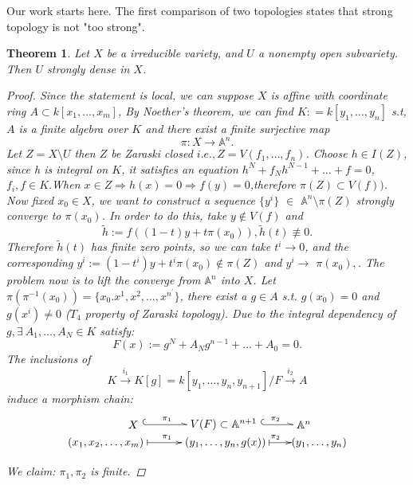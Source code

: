 \documentclass[a4paper]{article}
\newtheorem{thm}{Theorem}
\theoremstyle{definition}
\theoremstyle{remark}
\begin{document}
  Our work starts here. The first comparison of two topologies states that strong topology is not "too strong".
  \begin{thm} Let $X$ be a irreducible variety, and  $U$ a nonempty open subvariety. Then $U$ strongly dense in $X$.
    \begin{proof}
        Since the statement is local, we can suppose $ X $ is affine with coordinate ring $ A  \subset   k[x_1,   \dots,   x_m]  $, By Noether's theorem, we can find $K: =k [y_1,\dots,y_n]$ s.t, $A$ is a finite algebra over $K$ and there exist a finite surjective map
                     \[\pi: X \rightarrow \mathbb{A}^n.\]
         Let $ Z = X   \setminus U$ then $Z$  be Zaraski closed $i.e., Z=V(f_1,\dots,f_n)$. Choose $h\in I(Z)$, since h is integral on $K$, it satisfies an equation $h^N+f_Nh^{N-1}+\dots+f=0$, $f_i,f\in K.$When $x \in Z \Rightarrow h(x)=0 \Rightarrow f(y)=0$,therefore $\pi(Z)\subset V(f))$.
         Now fixed $x_0\in X$, we want to construct a sequence $\{y^i\}$ $\in$ $\mathbb{A}^n\setminus\pi(Z)$ strongly converge to $\pi(x_0)$. In order to do this, take $y \not \in V(f)$ and
                    \[\tilde{h}:=f((1-t)y+t\pi(x_0)), \tilde{h}(t)\not \equiv 0.\]
        Therefore $\tilde{h}(t)$ has finite zero points, so we can take $t^i \rightarrow 0$, and the corresponding $y^i:=(1-t^i)y+t^i\pi(x_0)\not \in \pi(Z)$ and $y^i \rightarrow$ $ \pi(x_0), $.
        The problem now is to lift the converge from $\mathbb{A}^n$ into $X$. Let$\pi(\pi^{-1}(x_0))=\{x_0.x^1,x^2,\dots,x^{n^\prime}\}$, there exist a $g\in A$ s.t. $g(x_0)=0$ and $g(x^i)\not = 0$ ($T_4$ property of Zaraski topology). Due to the integral dependency of $g, \exists  \ A_1,\dots,A_N \in K$ satisfy:
                    \[F(x):=g^N+A_Ng^{n-1}+\dots+A_0=0.\]
       The inclusions of
                     \[K \xrightarrow{i_1}     K[g]=k[y_1,\dots,y_n,y_{n+1}]/F \xrightarrow{i_2}      A\]
        induce a morphism chain:
        \begin{displaymath}
                \xymatrix@R=0ex@C=0ex{
                    *[l]{X \ \ }                             \ar@{^(-^>}[r]^(0.3){\pi_1}  &V(F)\subset \mathbb{A}^{n+1} \   \ar@{^(-^>}[r]^(0.7){\pi_2} & *[r]{ \ \mathbb{A}^{n}} \\
                    *[l]{(x_1,x_2,\dots,x_m) \ }    \ar@{|->}[r]^(0.3){\pi_1}        &(y_1,\dots,y_n,g(x))                       \ar@{|->}[r]^(0.7){\pi_2}      & *[r]{(y_1,\dots,y_n)}
                }
        \end{displaymath}
        
      We claim: $\pi_1,\pi_2$ is finite.
      

\end{proof}
\end{thm}
\end{document}
